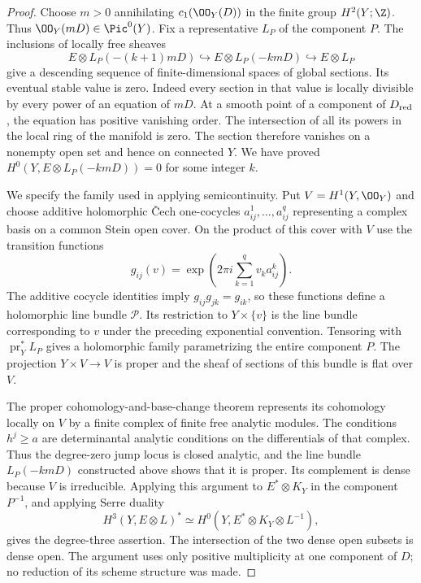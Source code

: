 \begin{proof}
Choose $m>0$ annihilating $c_1(\OO_Y(D))$ in the finite group
$H^2(Y;\Z)$. Thus $\OO_Y(mD)\in\Pic^0(Y)$. Fix a representative $L_P$
of the component $P$. The inclusions of locally free sheaves
\[
 E\otimes L_P(-(k+1)mD)\hookrightarrow E\otimes L_P(-kmD)
 \hookrightarrow E\otimes L_P
\]
give a descending sequence of finite-dimensional spaces of global
sections. Its eventual stable value is zero. Indeed every section in
that value is locally divisible by every power of an equation of
$mD$. At a smooth point of a component of $D_{\rm red}$, the equation
has positive vanishing order. The intersection of all its powers in
the local ring of the manifold is zero. The section therefore vanishes
on a nonempty open set and hence on connected $Y$. We have proved
$H^0(Y,E\otimes L_P(-kmD))=0$ for some integer $k$.

We specify the family used in applying semicontinuity. Put
$V=H^1(Y,\OO_Y)$ and choose additive holomorphic \v Cech
one-cocycles $a^1_{ij},\ldots,a^q_{ij}$ representing a complex basis
on a common Stein open cover. On the product of this cover with $V$
use the transition functions
\[
 g_{ij}(v)=\exp\left(2\pi i\sum_{k=1}^q v_k a^k_{ij}\right).
\]
The additive cocycle identities imply $g_{ij}g_{jk}=g_{ik}$,
so these functions define a holomorphic line bundle $\mathscr P$.
Its restriction to $Y\times\{v\}$ is the line bundle
corresponding to $v$ under the preceding exponential convention.
Tensoring with $\operatorname{pr}_Y^*L_P$ gives a holomorphic family
parametrizing the entire component $P$. The projection
$Y\times V\to V$ is proper and the sheaf of sections of this bundle
is flat over $V$.

The proper cohomology-and-base-change theorem represents its cohomology
locally on $V$ by a finite complex of finite free analytic modules.
The conditions $h^j\geq a$ are determinantal analytic conditions on
the differentials of that complex. Thus the degree-zero jump locus is
closed analytic, and the line bundle $L_P(-kmD)$ constructed above
shows that it is proper. Its complement is dense because $V$ is
irreducible. Applying this argument to $E^*\otimes K_Y$ in the
component $P^{-1}$, and applying Serre duality
\[
 H^3(Y,E\otimes L)^*
 \simeq H^0(Y,E^*\otimes K_Y\otimes L^{-1}),
\]
gives the degree-three assertion. The intersection of the two dense
open subsets is dense open. The argument uses only positive
multiplicity at one component of $D$; no reduction of its scheme
structure was made.
\end{proof}


